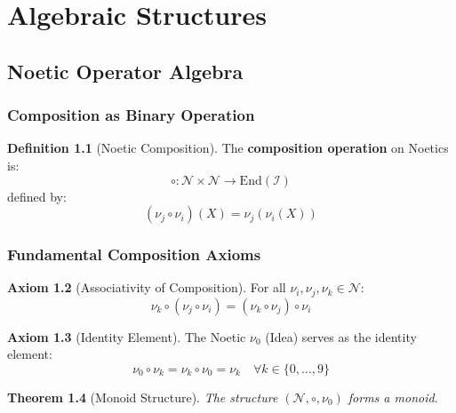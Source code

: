 \documentclass[11pt,twoside,openright]{book}
\theoremstyle{definition}
\newtheorem{definition}{Definition}[chapter]
\newtheorem{axiom}[definition]{Axiom}
\theoremstyle{plain}
\newtheorem{theorem}[definition]{Theorem}
\theoremstyle{remark}
\newcommand{\Ideas}{\mathcal{I}}
\newcommand{\Noetics}{\mathcal{N}}
\newcommand{\noe}[1]{\nu_{#1}}
\begin{document}
\part{Algebraic Structures}

\chapter{Noetic Operator Algebra}
\label{ch:noetic-algebra}

\section{Composition as Binary Operation}

\begin{definition}[Noetic Composition]
\label{def:noetic-composition}
The \textbf{composition operation} on Noetics is:
\[
\circ : \Noetics \times \Noetics \to \mathrm{End}(\Ideas)
\]
defined by:
\[
(\noe{j} \circ \noe{i})(X) = \noe{j}(\noe{i}(X))
\]
\end{definition}

\section{Fundamental Composition Axioms}

\begin{axiom}[Associativity of Composition]
\label{ax:assoc-comp}
For all $\noe{i}, \noe{j}, \noe{k} \in \Noetics$:
\[
\noe{k} \circ (\noe{j} \circ \noe{i}) = (\noe{k} \circ \noe{j}) \circ \noe{i}
\]
\end{axiom}

\begin{axiom}[Identity Element]
\label{ax:identity}
The Noetic $\noe{0}$ (Idea) serves as the identity element:
\[
\noe{0} \circ \noe{k} = \noe{k} \circ \noe{0} = \noe{k} \quad \forall k \in \{0,\ldots,9\}
\]
\end{axiom}

\begin{theorem}[Monoid Structure]
\label{thm:monoid}
The structure $(\Noetics, \circ, \noe{0})$ forms a monoid.
\end{theorem}
\end{document}
